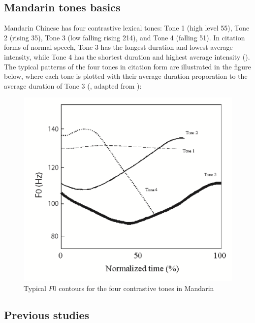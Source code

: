 \documentclass[12pt,letterpaper]{scrartcl}
\begin{document}
\subsection{Mandarin tones basics}

Mandarin Chinese has four contrastive lexical tones: Tone 1 (high level 55), Tone 2 (rising 35), Tone 3 (low falling rising 214), and Tone 4 (falling 51). In citation forms of normal speech, Tone 3 has the longest duration and lowest average intensity, while Tone 4 has the shortest duration and highest average intensity (\cite{chang.yao2007ToneProductionWhispered}). The typical patterns of the four tones in citation form are illustrated in the figure below, where each tone is plotted with their average duration proporation to the average duration of Tone 3 (\cite{liu.samuel2004PerceptionMandarinLexical}, adapted from \cite{xu1997Contextualtonalvariationsa}):

	\begin{figure}[h]
		\centering
		\includegraphics[scale=0.45]{F0_contours}
		\caption{Typical $F0$ contours for the four contrastive tones in Mandarin}
	\end{figure}

\subsection{Previous studies}

\end{document}
